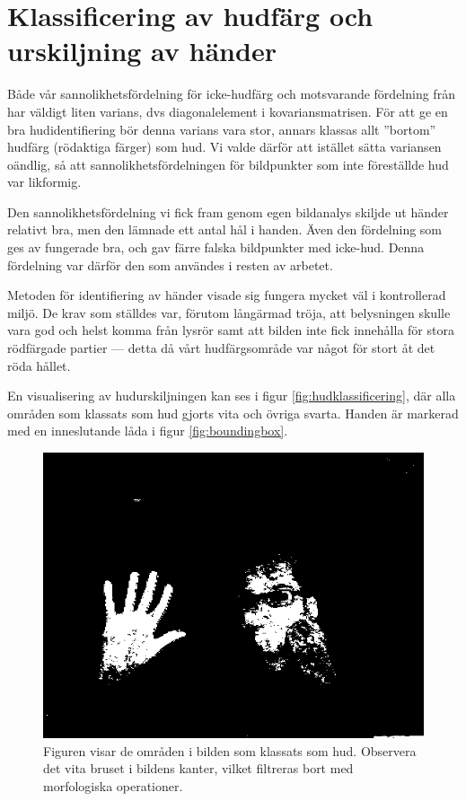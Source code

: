 \documentclass[../rapport_MVEX01-11-05]{subfiles}
\begin{document}
\section{Klassificering av hudfärg och urskiljning av händer}
Både vår sannolikhetsfördelning för icke-hudfärg och motsvarande
fördelning från  har väldigt liten varians,
dvs diagonalelement i kovariansmatrisen. För att ge en bra
hudidentifiering bör denna varians vara stor, annars klassas allt
''bortom'' hudfärg (rödaktiga färger) som hud. Vi valde därför att
istället sätta variansen oändlig, så att sannolikhetsfördelningen för
bildpunkter som inte föreställde hud var likformig.

Den sannolikhetsfördelning vi fick fram genom egen bildanalys skiljde
ut händer relativt bra, men den lämnade ett antal hål i handen. Även
den fördelning som ges av  fungerade bra, och
gav färre falska bildpunkter med icke-hud. Denna fördelning var därför den som
användes i resten av arbetet. 

Metoden för identifiering av händer visade sig fungera mycket väl i
kontrollerad miljö. De krav som ställdes var, förutom långärmad
tröja, att belysningen skulle vara god och helst komma från lysrör
samt att bilden inte fick innehålla för stora rödfärgade partier --- detta
då vårt hudfärgsområde var något för stort åt det röda hållet. 

En visualisering av hudurskiljningen kan ses i figur
\vref{fig:hudklassificering}, där alla områden som klassats som hud
gjorts vita och övriga svarta. Handen är markerad med en inneslutande
låda i figur \vref{fig:boundingbox}.

\begin{figure}
  \centering
  \includegraphics[width=0.9\columnwidth]{bilder/whiteskin}
  \caption{Figuren visar de områden i bilden som klassats som hud.
  Observera det vita bruset i bildens kanter, vilket filtreras bort med
  morfologiska operationer.}
  \label{fig:hudklassificering}
\end{figure}
\end{document}
